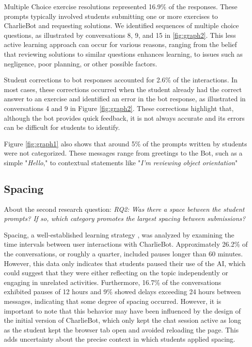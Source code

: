\documentclass[a4paper,twoside]{article}
\begin{document}
Multiple Choice exercise resolutions represented 16.9\% of the responses.
These prompts typically involved students submitting one or more exercises to
CharlieBot and requesting solutions. We identified sequences of multiple choice
questions, as illustrated by conversations 8, 9, and 15 in \ref{fig:graph2}.
This less active learning approach can occur for various reasons, ranging from
the belief that reviewing solutions to similar questions enhances learning, to
issues such as negligence, poor planning, or other possible factors.

Student corrections to bot responses accounted for 2.6\% of the
interactions. In most cases, these corrections occurred when the student already
had the correct answer to an exercise and identified an error in the bot
response, as illustrated in conversations 4 and 9 in Figure \ref{fig:graph2}.
These corrections highlight that, although the bot provides quick feedback, it
is not always accurate and its errors can be difficult for students to
identify.

Figure \ref{fig:graph1} also shows that around 5\% of the prompts written by
students were not categorized. These messages range from greetings to the Bot,
such as a simple "\textit{Hello}," to contextual statements like
"\textit{I'm reviewing object orientation}"

\subsection{Spacing}


About the second research question: \textit{RQ2: Was there a space between the
student prompts? If so, which category promotes the largest spacing between
submissions?}

Spacing, a well-established learning strategy \citep{Carvalho20}, was analyzed
by examining the time intervals between user interactions with CharlieBot.
Approximately 26.2\% of the conversations, or roughly a quarter, included pauses
longer than 60 minutes. However, this data only indicates that students paused
their use of the AI, which could suggest that they were either reflecting on the
topic independently or engaging in unrelated activities. Furthermore, 16.7\%
of the conversations exhibited pauses of 12 hours and 9\% showed delays
exceeding 24 hours between messages, indicating that some degree of spacing
occurred. However, it is important to note that this behavior may have been
influenced by the design of the initial version of CharlieBot, which only kept
the chat session active as long as the student kept the browser tab open and
avoided reloading the page. This adds uncertainty about the precise context in
which students applied spacing.
\end{document}
